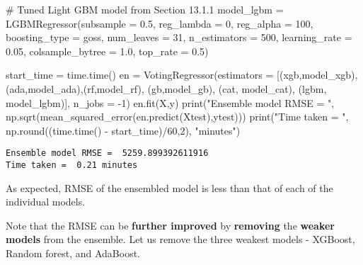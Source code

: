 \documentclass[
  letterpaper,
  DIV=11,
  numbers=noendperiod]{scrreprt}
\newenvironment{Shaded}{\begin{snugshade}}{\end{snugshade}}
\newcommand{\BuiltInTok}[1]{\textcolor[rgb]{0.00,0.23,0.31}{#1}}
\newcommand{\CommentTok}[1]{\textcolor[rgb]{0.37,0.37,0.37}{#1}}
\newcommand{\DecValTok}[1]{\textcolor[rgb]{0.68,0.00,0.00}{#1}}
\newcommand{\FloatTok}[1]{\textcolor[rgb]{0.68,0.00,0.00}{#1}}
\newcommand{\NormalTok}[1]{\textcolor[rgb]{0.00,0.23,0.31}{#1}}
\newcommand{\OperatorTok}[1]{\textcolor[rgb]{0.37,0.37,0.37}{#1}}
\newcommand{\StringTok}[1]{\textcolor[rgb]{0.13,0.47,0.30}{#1}}
\begin{document}
\begin{Shaded}
\begin{Highlighting}[]
\CommentTok{\# Tuned Light GBM model from Section 13.1.1}
\NormalTok{model\_lgbm }\OperatorTok{=}\NormalTok{ LGBMRegressor(subsample }\OperatorTok{=} \FloatTok{0.5}\NormalTok{, reg\_lambda }\OperatorTok{=} \DecValTok{0}\NormalTok{, reg\_alpha }\OperatorTok{=} \DecValTok{100}\NormalTok{, boosting\_type }\OperatorTok{=} \StringTok{\textquotesingle{}goss\textquotesingle{}}\NormalTok{,}
\NormalTok{                           num\_leaves }\OperatorTok{=} \DecValTok{31}\NormalTok{, n\_estimators }\OperatorTok{=} \DecValTok{500}\NormalTok{, learning\_rate }\OperatorTok{=} \FloatTok{0.05}\NormalTok{, }
\NormalTok{                           colsample\_bytree }\OperatorTok{=} \FloatTok{1.0}\NormalTok{, top\_rate }\OperatorTok{=} \FloatTok{0.5}\NormalTok{)}

\NormalTok{start\_time }\OperatorTok{=}\NormalTok{ time.time()}
\NormalTok{en }\OperatorTok{=}\NormalTok{ VotingRegressor(estimators }\OperatorTok{=}\NormalTok{ [(}\StringTok{\textquotesingle{}xgb\textquotesingle{}}\NormalTok{,model\_xgb),(}\StringTok{\textquotesingle{}ada\textquotesingle{}}\NormalTok{,model\_ada),(}\StringTok{\textquotesingle{}rf\textquotesingle{}}\NormalTok{,model\_rf),}
\NormalTok{                    (}\StringTok{\textquotesingle{}gb\textquotesingle{}}\NormalTok{,model\_gb), (}\StringTok{\textquotesingle{}cat\textquotesingle{}}\NormalTok{, model\_cat), (}\StringTok{\textquotesingle{}lgbm\textquotesingle{}}\NormalTok{, model\_lgbm)], n\_jobs }\OperatorTok{=} \OperatorTok{{-}}\DecValTok{1}\NormalTok{)}
\NormalTok{en.fit(X,y)}
\BuiltInTok{print}\NormalTok{(}\StringTok{"Ensemble model RMSE = "}\NormalTok{, np.sqrt(mean\_squared\_error(en.predict(Xtest),ytest)))}
\BuiltInTok{print}\NormalTok{(}\StringTok{"Time taken = "}\NormalTok{, np.}\BuiltInTok{round}\NormalTok{((time.time() }\OperatorTok{{-}}\NormalTok{ start\_time)}\OperatorTok{/}\DecValTok{60}\NormalTok{,}\DecValTok{2}\NormalTok{), }\StringTok{"minutes"}\NormalTok{)}
\end{Highlighting}
\end{Shaded}

\begin{verbatim}
Ensemble model RMSE =  5259.899392611916
Time taken =  0.21 minutes
\end{verbatim}

As expected, RMSE of the ensembled model is less than that of each of
the individual models.

Note that the RMSE can be \textbf{further improved} by \textbf{removing}
the \textbf{weaker models} from the ensemble. Let us remove the three
weakest models - XGBoost, Random forest, and AdaBoost.
\end{document}
